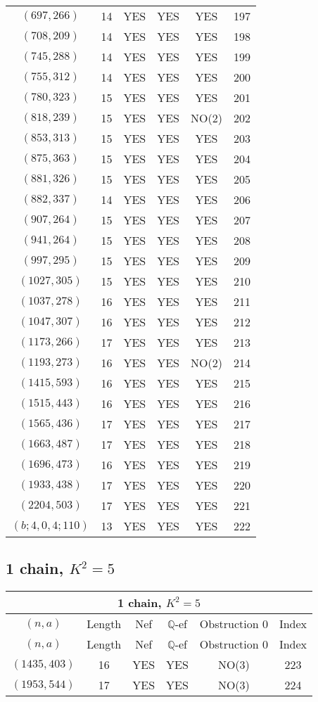 \begin{longtable}{|c|c|c|c|c|c|}
$(697, 266)$ & 14 & YES & YES & YES & 197\\
$(708, 209)$ & 14 & YES & YES & YES & 198\\
$(745, 288)$ & 14 & YES & YES & YES & 199\\
$(755, 312)$ & 14 & YES & YES & YES & 200\\
$(780, 323)$ & 15 & YES & YES & YES & 201\\
$(818, 239)$ & 15 & YES & YES & NO(2) & 202\\
$(853, 313)$ & 15 & YES & YES & YES & 203\\
$(875, 363)$ & 15 & YES & YES & YES & 204\\
$(881, 326)$ & 15 & YES & YES & YES & 205\\
$(882, 337)$ & 14 & YES & YES & YES & 206\\
$(907, 264)$ & 15 & YES & YES & YES & 207\\
$(941, 264)$ & 15 & YES & YES & YES & 208\\
$(997, 295)$ & 15 & YES & YES & YES & 209\\
$(1027, 305)$ & 15 & YES & YES & YES & 210\\
$(1037, 278)$ & 16 & YES & YES & YES & 211\\
$(1047, 307)$ & 16 & YES & YES & YES & 212\\
$(1173, 266)$ & 17 & YES & YES & YES & 213\\
$(1193, 273)$ & 16 & YES & YES & NO(2) & 214\\
$(1415, 593)$ & 16 & YES & YES & YES & 215\\
$(1515, 443)$ & 16 & YES & YES & YES & 216\\
$(1565, 436)$ & 17 & YES & YES & YES & 217\\
$(1663, 487)$ & 17 & YES & YES & YES & 218\\
$(1696, 473)$ & 16 & YES & YES & YES & 219\\
$(1933, 438)$ & 17 & YES & YES & YES & 220\\
$(2204, 503)$ & 17 & YES & YES & YES & 221\\
$(b; 4, 0, 4; 110)$ & 13 & YES & YES & YES & 222
\end{longtable}
\subsection{1 chain, $K^2 = 5$}
\begin{longtable}{|c|c|c|c|c|c|}
\hline
\multicolumn{6}{|c|}{1 chain, $K^2 = 5$}\\
\hline
$(n,a)$ & Length & Nef & $\mathbb Q$-ef & Obstruction 0 & Index\\
\hline
\endfirsthead

\hline
$(n,a)$ & Length & Nef & $\mathbb Q$-ef & Obstruction 0 & Index\\
\hline
\endhead
\hline
\endfoot

$(1435, 403)$ & 16 & YES & YES & NO(3) & 223\\
$(1953, 544)$ & 17 & YES & YES & NO(3) & 224
\end{longtable}

